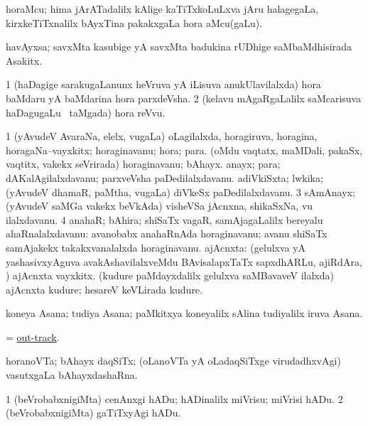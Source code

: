 \bentry
{}
\gl{\nA}
\bmng
horaMcu; hima jArATadalilx kAlige kaTiTxkoLuLxva jAru halagegaLa, kirxkeTiTxnalilx bAyxTina pakakxgaLa hora aMcu(gaLu). 
\emng
\eentry

\bentry
{}
\gl{\nA}
\bmng
havAyxsa; savxMta kasubige yA savxMta badukina rUDhige saMbaMdhisirada Asakitx. 
\emng
\eentry

\bentry
{}
\gl{\nA}
\bmng
\bnum
\num{1} (haDagige sarakugaLanunx heVruva yA iLisuva anukUlavilalxda) hora baMdaru yA baMdarina hora parxdeVsha. 
\num{2} (kelavu mAgaRgaLalilx saMcarisuva haDagugaLu \sA\ taMgada) hora reVvu. 
\enum
\emng
\eentry

\bentry
{}
\gl{\nA}
\bmng
\bnum
\num{1} (yAvudeV AvaraNa, elelx, \mo vugaLa) oLagilalxda, horagiruva, horagina, horagaNa--vayxkitx; horaginavanu; hora; para. 
 (oMdu vaqtatx, maMDali, pakaSx, vaqtitx, \mo vakekx seVrirada) 
\banum
{} horaginavanu; bAhayx. 
 anayx; para; dAKalAgilalxdavanu; parxveVsha paDedilalxdavanu. 
 adiVkiSxta; lwkika; (yAvudeV dhamaR, paMtha, \mo vugaLa) diVkeSx paDedilalxdavanu. 
\eanum
\numie
\num{3} sAmAnayx; (yAvudeV saMGa \mo vakekx beVkAda) visheVSa jAcnxna, shikaSxNa, \mo vu ilalxdavanu. 
\num{4} anahaR; bAhira; shiSaTx vagaR, samAjagaLalilx bereyalu ahaRnalalxdavanu:  avanobabx anahaRnAda horaginavanu; avanu shiSaTx samAjakekx takakxvanalalxda horaginavanu. 
 ajAcnxta: 
\banum
{} (gelulxva yA yashasivxyAguva avakAshavilalxveMdu BAvisalapxTaTx sapxdhARLu, ajiRdAra, \mo) ajAcnxta vayxkitx. 
 (kudure paMdayxdalilx gelulxva saMBavaveV ilalxda) ajAcnxta kudure; hesareV keVLirada kudure. 
\eanum
\numie
\enum
\emng
\eentry

\bentry
{}
\gl{\nA}
\bmng
koneya Asana; tudiya Asana; paMkitxya koneyalilx sAlina tudiyalilx iruva Asana. 
\emng
\eentry

\bentry
{}
\gl{\nA}
\bmng
= \hyperlink{out-track}{out-track}. 
\emng
\eentry

\bentry
{}
\gl{\nA}
\bmng
horanoVTa; bAhayx daqSiTx; (oLanoVTa yA oLadaqSiTxge virudadhxvAgi) vasutxgaLa bAhayxdashaRna. 
\emng
\eentry

\bentry
{}
\gl{\sakirx}
\bmng
\bnum
\num{1} (beVrobabxnigiMta) cenAnxgi hADu; hADinalilx miVrisu; miVrisi hADu. 
\num{2} (beVrobabxnigiMta) gaTiTxyAgi hADu. 
\enum
\emng
\eentry

